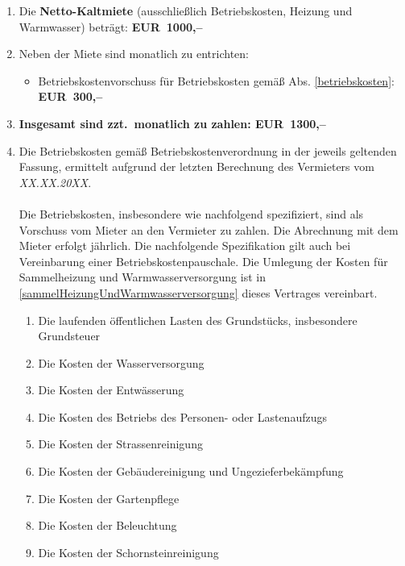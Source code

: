 \documentclass{scrreprt}[12pt,a4paper,twoside,duplex]
\newcommand{\mietWaehrung}{\textcolor{zuBearbeiten}{EUR}}
\newcommand{\mietPreisKalt}{\textcolor{zuBearbeiten}{1000,--}}
\newcommand{\mietNebenkosten}{\textcolor{zuBearbeiten}{300,--}}
\newcommand{\mieteGesamt}{\textcolor{zuBearbeiten}{1300,--}}
\newcommand{\betriebskostenZuletztErmitteltAm}{\textcolor{zuBearbeiten}{XX.XX.20XX}}
\begin{document}
\begin{contract}

\begin{enumerate}
  \item Die \textbf{Netto-Kaltmiete} (ausschließlich Betriebskosten, Heizung und Warmwasser) beträgt: \textbf{\mietWaehrung\ \mietPreisKalt}
  \item Neben der Miete sind monatlich zu entrichten:
    \begin{itemize}
      \item Betriebskostenvorschuss für Betriebskosten gemäß Abs.
      \ref{betriebskosten}: \textbf{\mietWaehrung\ \mietNebenkosten}
    \end{itemize}
  \item \textbf{Insgesamt sind zzt.\ monatlich zu zahlen: \mietWaehrung\ \mieteGesamt}
  \item\label{betriebskosten} Die Betriebskosten gemäß Betriebskostenverordnung
  in der jeweils geltenden Fassung, ermittelt aufgrund der letzten Berechnung
  des Vermieters vom \textsl{\betriebskostenZuletztErmitteltAm}.\\
  \\
  Die Betriebskosten, insbesondere wie nachfolgend spezifiziert, sind als
  Vorschuss vom Mieter an den Vermieter zu zahlen. Die Abrechnung mit dem Mieter
  erfolgt jährlich. Die nachfolgende Spezifikation gilt auch bei Vereinbarung
  einer Betriebskostenpauschale. Die Umlegung der Kosten für Sammelheizung und
  Warmwasserversorgung ist in \ref{sammelHeizungUndWarmwasserversorgung} dieses
  Vertrages vereinbart.
  \begin{multicols}{2}
    \begin{enumerate}[label*=\arabic*\,)]
      \item Die laufenden öffentlichen Lasten des Grundstücks, insbesondere
      Grundsteuer
      \item Die Kosten der Wasserversorgung
      \item Die Kosten der Entwässerung
      \item Die Kosten des Betriebs des Per\-so\-nen- oder La\-sten\-auf\-zugs
      \item Die Kosten der Strassenreinigung
      \item Die Kosten der Ge\-bäu\-de\-rei\-ni\-gung und Ungezieferbekämpfung
      \item Die Kosten der Gartenpflege
      \item Die Kosten der Beleuchtung
      \item Die Kosten der Schornsteinreinigung

\end{enumerate}
\end{multicols}
\end{enumerate}
\end{contract}
\end{document}
